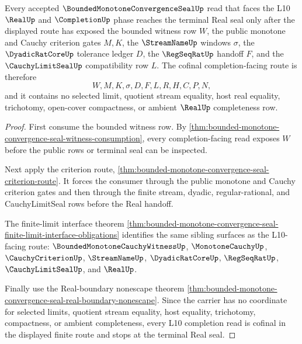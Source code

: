 \begin{theorem}
\label{thm:bounded-monotone-convergence-seal-l10-completion-cofinality}
Every accepted $\BoundedMonotoneConvergenceSealUp$ read that faces the L10 $\RealUp$ and $\CompletionUp$ phase reaches the terminal Real seal only after the displayed route has exposed the bounded witness row $W$, the public monotone and Cauchy criterion gates $M,K$, the $\StreamNameUp$ windows $\sigma$, the $\DyadicRatCoreUp$ tolerance ledger $D$, the $\RegSeqRatUp$ handoff $F$, and the $\CauchyLimitSealUp$ compatibility row $L$. The cofinal completion-facing route is therefore
$$
W,M,K,\sigma,D,F,L,R,H,C,P,N,
$$
and it contains no selected limit, quotient stream equality, host real equality, trichotomy, open-cover compactness, or ambient $\RealUp$ completeness row.
\end{theorem}
\begin{proof}
First consume the bounded witness row. By \autoref{thm:bounded-monotone-convergence-seal-witness-consumption}, every completion-facing read exposes $W$ before the public rows or terminal seal can be inspected.

Next apply the criterion route, \autoref{thm:bounded-monotone-convergence-seal-criterion-route}. It forces the consumer through the public monotone and Cauchy criterion gates and then through the finite stream, dyadic, regular-rational, and CauchyLimitSeal rows before the Real handoff.

The finite-limit interface theorem \autoref{thm:bounded-monotone-convergence-seal-finite-limit-interface-obligations} identifies the same sibling surfaces as the L10-facing route: $\BoundedMonotoneCauchyWitnessUp$, $\MonotoneCauchyUp$, $\CauchyCriterionUp$, $\StreamNameUp$, $\DyadicRatCoreUp$, $\RegSeqRatUp$, $\CauchyLimitSealUp$, and $\RealUp$.

Finally use the Real-boundary nonescape theorem \autoref{thm:bounded-monotone-convergence-seal-real-boundary-nonescape}. Since the carrier has no coordinate for selected limits, quotient stream equality, host equality, trichotomy, compactness, or ambient completeness, every L10 completion read is cofinal in the displayed finite route and stops at the terminal Real seal.
\end{proof}

